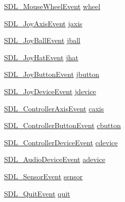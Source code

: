 \begin{DoxyCompactItemize}
\item 
\mbox{\hyperlink{struct_s_d_l___mouse_wheel_event}{S\+D\+L\+\_\+\+Mouse\+Wheel\+Event}} \mbox{\hyperlink{union_s_d_l___event_a267d3f550715519ec90a81ccd0e6cbda}{wheel}}
\item 
\mbox{\hyperlink{struct_s_d_l___joy_axis_event}{S\+D\+L\+\_\+\+Joy\+Axis\+Event}} \mbox{\hyperlink{union_s_d_l___event_ac4611acd0e9c675e67dc20919f0accb4}{jaxis}}
\item 
\mbox{\hyperlink{struct_s_d_l___joy_ball_event}{S\+D\+L\+\_\+\+Joy\+Ball\+Event}} \mbox{\hyperlink{union_s_d_l___event_ae433f511e3383d17f8fe02df745ee8f8}{jball}}
\item 
\mbox{\hyperlink{struct_s_d_l___joy_hat_event}{S\+D\+L\+\_\+\+Joy\+Hat\+Event}} \mbox{\hyperlink{union_s_d_l___event_a421b40e0f8e01f181c8d5548cff1dd1d}{jhat}}
\item 
\mbox{\hyperlink{struct_s_d_l___joy_button_event}{S\+D\+L\+\_\+\+Joy\+Button\+Event}} \mbox{\hyperlink{union_s_d_l___event_a591104d64903ae1cf70874fb5d3124ff}{jbutton}}
\item 
\mbox{\hyperlink{struct_s_d_l___joy_device_event}{S\+D\+L\+\_\+\+Joy\+Device\+Event}} \mbox{\hyperlink{union_s_d_l___event_a17514dc19a846ea1b5fbe44123700c4c}{jdevice}}
\item 
\mbox{\hyperlink{struct_s_d_l___controller_axis_event}{S\+D\+L\+\_\+\+Controller\+Axis\+Event}} \mbox{\hyperlink{union_s_d_l___event_aa8f6df0f2716fae56204b12ab4a4c289}{caxis}}
\item 
\mbox{\hyperlink{struct_s_d_l___controller_button_event}{S\+D\+L\+\_\+\+Controller\+Button\+Event}} \mbox{\hyperlink{union_s_d_l___event_aee2b5671c8dcdb447023715cc21593cb}{cbutton}}
\item 
\mbox{\hyperlink{struct_s_d_l___controller_device_event}{S\+D\+L\+\_\+\+Controller\+Device\+Event}} \mbox{\hyperlink{union_s_d_l___event_ad3beed01e690b885728e0b0e1d636378}{cdevice}}
\item 
\mbox{\hyperlink{struct_s_d_l___audio_device_event}{S\+D\+L\+\_\+\+Audio\+Device\+Event}} \mbox{\hyperlink{union_s_d_l___event_a111e01fcac4fd8e251a6058ff9f17e72}{adevice}}
\item 
\mbox{\hyperlink{struct_s_d_l___sensor_event}{S\+D\+L\+\_\+\+Sensor\+Event}} \mbox{\hyperlink{union_s_d_l___event_af0da8e4a59228360984595125062eb2f}{sensor}}
\item 
\mbox{\hyperlink{struct_s_d_l___quit_event}{S\+D\+L\+\_\+\+Quit\+Event}} \mbox{\hyperlink{union_s_d_l___event_a102a3008afe67a1c02ae7504e232dcef}{quit}}
\item 

\end{DoxyCompactItemize}

